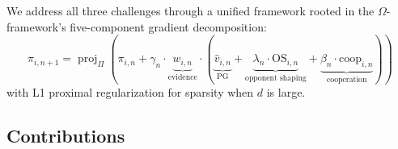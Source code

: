 \documentclass[11pt,a4paper]{article}
\DeclareMathOperator{\proj}{proj}
\begin{document}
We address all three challenges through a unified framework rooted in
the $\Omega$-framework's five-component gradient decomposition:
\begin{equation}\label{eq:omega-gradient}
\boxed{
    \pi_{i,n+1} = \proj_\Pi\!\left(\pi_{i,n} + \gamma_n \cdot
    \underbrace{w_{i,n}}_{\text{evidence}} \cdot \left(
    \underbrace{\hat{v}_{i,n}}_{\text{PG}}
    + \underbrace{\lambda_n \cdot \text{OS}_{i,n}}_{\text{opponent shaping}}
    + \underbrace{\beta_n \cdot \text{coop}_{i,n}}_{\text{cooperation}}
    \right)\right)
}
\end{equation}
with L1 proximal regularization for sparsity when $d$ is large.


\subsection{Contributions}
\end{document}
